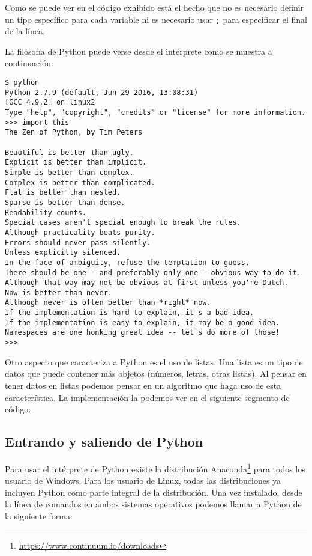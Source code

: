 \documentclass{report}
\begin{document}
Como se puede ver en el código exhibido está el hecho que no es necesario 
definir un tipo específico para cada variable ni es necesario usar {\tt{;}}
para especificar el final de la línea. 

La filosofía de Python puede verse desde el intérprete como se muestra a 
continuación:

\begin{verbatim}
$ python
Python 2.7.9 (default, Jun 29 2016, 13:08:31) 
[GCC 4.9.2] on linux2
Type "help", "copyright", "credits" or "license" for more information.
>>> import this
The Zen of Python, by Tim Peters

Beautiful is better than ugly.
Explicit is better than implicit.
Simple is better than complex.
Complex is better than complicated.
Flat is better than nested.
Sparse is better than dense.
Readability counts.
Special cases aren't special enough to break the rules.
Although practicality beats purity.
Errors should never pass silently.
Unless explicitly silenced.
In the face of ambiguity, refuse the temptation to guess.
There should be one-- and preferably only one --obvious way to do it.
Although that way may not be obvious at first unless you're Dutch.
Now is better than never.
Although never is often better than *right* now.
If the implementation is hard to explain, it's a bad idea.
If the implementation is easy to explain, it may be a good idea.
Namespaces are one honking great idea -- let's do more of those!
>>> 
\end{verbatim}

Otro aspecto que caracteriza a Python es el uso de listas. Una lista es un
tipo de datos que puede contener más objetos (números, letras, otras listas).
Al pensar en tener datos en listas podemos pensar en un algoritmo que haga uso
de esta característica. La implementación la podemos ver en el siguiente 
segmento de código:



\subsection{Entrando y saliendo de Python}

Para usar el intérprete de Python existe la distribución Anaconda\footnote{
\url{https://www.continuum.io/downloads}} para todos los usuario de Windows. 
Para los usuario de Linux, todas las distribuciones ya incluyen Python como 
parte integral de la distribución. Una vez instalado, desde la línea de 
comandos en ambos sistemas operativos podemos llamar a Python de la siguiente
forma:
\end{document}
